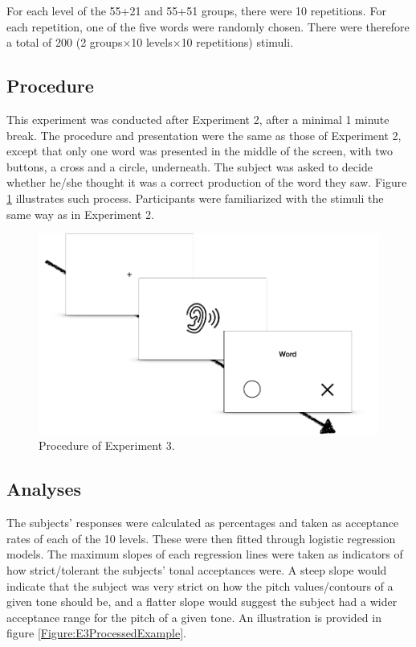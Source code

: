 \documentclass[12pt]{report}
\begin{document}
\begin{CJK}{UTF8}{bsmi}
For each level of the 55+21 and 55+51 groups, there were 10 repetitions. For each repetition, one of the five words were randomly chosen. There were therefore a total of 200 (2 groups$\times$10 levels$\times$10 repetitions) stimuli.

\subsection{Procedure}
This experiment was conducted after Experiment 2, after a minimal 1 minute break. The procedure and presentation were the same as those of Experiment 2, except that only one word was presented in the middle of the screen, with two buttons, a cross and a circle, underneath. The subject was asked to decide whether he/she thought it was a correct production of the word they saw. Figure \ref{Figure:Experiment3Procedure} illustrates such process. Participants were familiarized with the stimuli the same way as in Experiment 2.

\begin{figure}[h]
\centering
\includegraphics[width=.7\textwidth]{Figures/E3/Procedure.png}
\caption{Procedure of Experiment 3.}
\label{Figure:Experiment3Procedure}
\end{figure}

\subsection{Analyses}
The subjects' responses were calculated as percentages and taken as acceptance rates of each of the 10 levels. These were then fitted through logistic regression models. The maximum slopes of each regression lines were taken as indicators of how strict/tolerant the subjects' tonal acceptances were. A steep slope would indicate that the subject was very strict on how the pitch values/contours of a given tone should be, and a flatter slope would suggest the subject had a wider acceptance range for the pitch of a given tone. An illustration is provided in figure \ref{Figure:E3ProcessedExample}.


\end{CJK}
\end{document}
